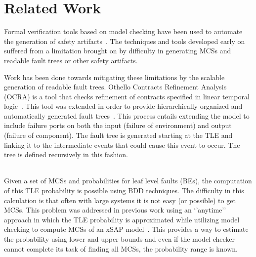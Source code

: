 \section{Related Work}
\label{sec:related_work}

Formal verification tools based on model checking have been used to automate the generation of safety artifacts~\cite{symbAltaRica,10.1007/978-3-540-75596-8-13, DBLP:conf/tacas/BittnerBCCGGMMZ16}. The techniques and tools developed early on suffered from a limitation brought on by difficulty in generating MCSs and readable fault trees or other safety artifacts.

 Work has been done towards mitigating these limitations by the scalable generation of readable fault trees. Othello Contracts Refinement Analysis (OCRA) is a tool that checks refinement of contracts specified in linear temporal logic~\cite{6693137}. This tool was extended in order to provide hierarchically organized and automatically generated fault trees~\cite{10.1007/978-3-319-11936-6-7}. This process entails extending the model to include failure ports on both the input (failure of environment) and output (failure of component). The fault tree is generated starting at the TLE and linking it to the intermediate events that could cause this event to occur. The tree is defined recursively in this fashion. 

\\

Given a set of MCSs and probabilities for leaf level faults (BEs), the computation of this TLE probability is possible using BDD techniques. The difficulty in this calculation is that often with large systems it is not easy (or possible) to get MCSs. This problem was addressed in previous work using an `'anytime'' approach in which the TLE probability is approximated while utilizing model checking to compute MCSs of an xSAP model~\cite{CAV2015:BoCiGrMa,mattareiThesis}. This provides a way to estimate the probability using lower and upper bounds and even if the model checker cannot complete its task of finding all MCSs, the probability range is known. 


